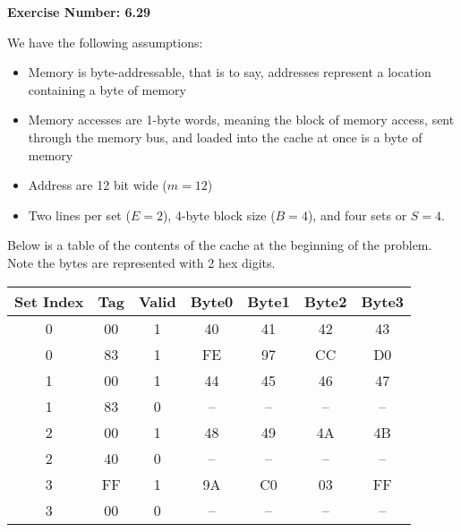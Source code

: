 \documentclass{article}
\begin{document}
\noindent \textbf{Exercise Number: 6.29}  %

\medskip 

We have the following assumptions:

\begin{itemize}

\item Memory is byte-addressable, that is to say, addresses represent a location containing
a byte of memory

\item Memory accesses are 1-byte words, meaning the block of memory access, sent through the
memory bus, and loaded into the cache at once is a byte of memory

\item Address are 12 bit wide ($m  = 12$) 

\item Two lines per set ($E=2$), 4-byte block size ($B = 4$), and four sets or $S = 4$.

\end{itemize}

Below is a table of the contents of the cache at the beginning of the problem. Note the bytes 
are represented with 2 hex digits. 

\bigskip

\begin{center}
  \begin{tabular}{*{7}{c}}
   Set Index  &   Tag   &   Valid   &  Byte0 &   Byte1  &   Byte2   &   Byte3   \\ \hline

    0         &   00    &   1       &  40    &    41    &   42      &   43  \\

    0         &   83    &   1       &  FE    &   97     &   CC      &   D0  \\

    1         &   00    &   1       &  44    &   45     &   46      &   47  \\

    1         &   83    &   0       & --     &   --     &   --      &   --  \\

    2         &   00    &   1      &  48     &   49     &  4A     &   4B    \\

    2         &   40    &   0      &  --     &   --     &  --      &   --   \\

    3         &   FF    &   1      &  9A   &   C0    &  03     &   FF       \\

    3         &   00    &   0       &  --    &  --  &  --      &   --       \\

  \end{tabular}
\end{center}
\end{document}
